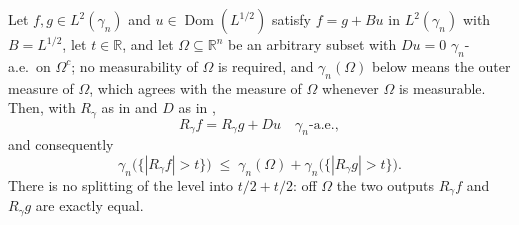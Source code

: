 \begin{lemma}
Let $f, g \in L^2(\gamma_n)$ and $u \in \operatorname{Dom}(L^{1/2})$ satisfy
$f = g + Bu$ in $L^2(\gamma_n)$ with $B = L^{1/2}$, let $t \in \mathbb{R}$, and let
$\Omega \subseteq \mathbb{R}^n$ be an arbitrary subset with $Du = 0$
$\gamma_n$-a.e.\ on $\Omega^c$; no measurability of $\Omega$ is required, and
$\gamma_n(\Omega)$ below means the outer measure of $\Omega$, which agrees with
the measure of $\Omega$ whenever $\Omega$ is measurable.  Then, with $R_\gamma$
as in  and $D$ as in ,
\[
  R_\gamma f = R_\gamma g + Du \quad \gamma_n\text{-a.e.},
\]
and consequently
\[
  \gamma_n\bigl(\{|R_\gamma f| > t\}\bigr)
    \;\leq\; \gamma_n(\Omega) + \gamma_n\bigl(\{|R_\gamma g| > t\}\bigr) .
\]
There is no splitting of the level into $t/2 + t/2$: off $\Omega$ the two outputs
$R_\gamma f$ and $R_\gamma g$ are exactly equal.
\end{lemma}
